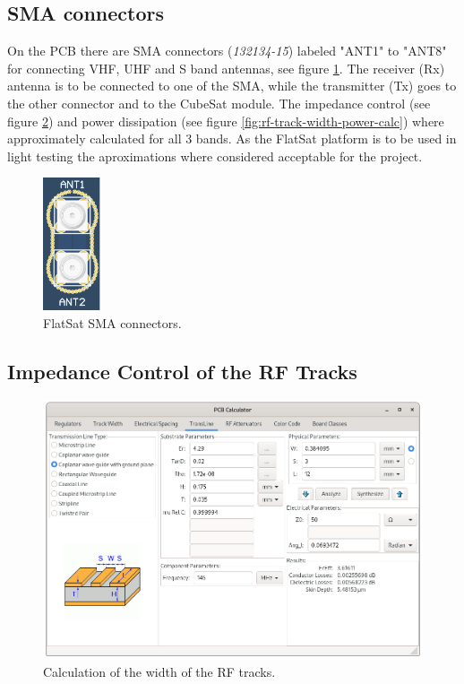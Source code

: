 \subsection{SMA connectors}

On the PCB there are SMA connectors (\textit{132134-15}) labeled "ANT1" to "ANT8" for connecting VHF, UHF and S band antennas, see figure \ref{fig:antennas-smas}. The receiver (Rx) antenna is to be connected to one of the SMA, while the transmitter (Tx) goes to the other connector and to the CubeSat module. The impedance control (see figure \ref{fig:rf-track-width-calc}) and power dissipation (see figure \ref{fig:rf-track-width-power-calc}) where approximately calculated for all 3 bands. As the FlatSat platform is to be used in light testing the aproximations where considered acceptable for the project.

\begin{figure}[!ht]
    \begin{center}
        \includegraphics[width=0.15\textwidth]{figures/antennas_smas.png}
        \caption{FlatSat SMA connectors.}
        \label{fig:antennas-smas}
    \end{center}
\end{figure}

\subsection{Impedance Control of the RF Tracks}

\begin{figure}[!ht]
    \begin{center}
        \includegraphics[width=\textwidth]{figures/rf-track-width.png}
        \caption{Calculation of the width of the RF tracks.}
        \label{fig:rf-track-width-calc}
    \end{center}
\end{figure}


